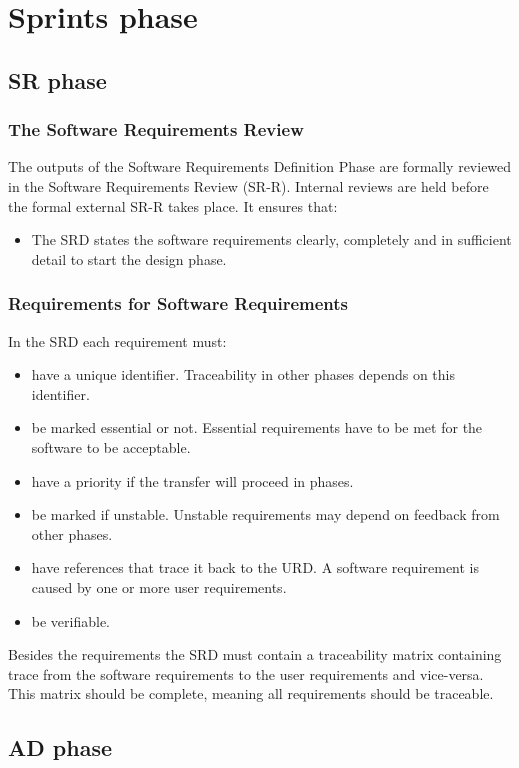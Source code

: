 \chapter{Sprints phase} \label{Sprints phase}

\section{SR phase}
\subsection{The Software Requirements Review}
The outputs of the Software Requirements Definition Phase are formally reviewed in the Software Requirements Review (SR-R). Internal reviews are held before the formal external SR-R takes place. It ensures that:
\begin{itemize}
	\item The SRD states the software requirements clearly, completely and in sufficient detail to start the design phase.
\end{itemize}

\subsection{Requirements for Software Requirements}
In the SRD each requirement must:
\begin{itemize}
	\item have a unique identifier. Traceability in other phases depends on this identifier.
	\item be marked essential or not. Essential requirements have to be met for the software to be acceptable.
	\item have a priority if the transfer will proceed in phases.
	\item be marked if unstable. Unstable requirements may depend on feedback from other phases.
	\item have references that trace it back to the URD. A software requirement is caused by one or more user requirements.
	\item be verifiable.
\end{itemize}

Besides the requirements the SRD must contain a traceability matrix containing trace from the software requirements to the user requirements and vice-versa. This matrix should be complete, meaning all requirements should be traceable.

\section{AD phase}
